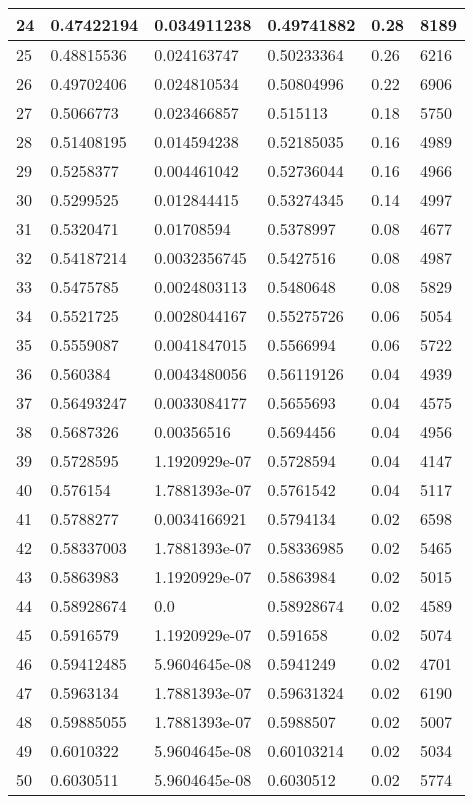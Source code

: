 \begin{longtable}{|l|l|l|l|l|l|}
24 & 0.47422194 & 0.034911238 & 0.49741882 & 0.28 & 8189 \\ \hline 
25 & 0.48815536 & 0.024163747 & 0.50233364 & 0.26 & 6216 \\ \hline 
26 & 0.49702406 & 0.024810534 & 0.50804996 & 0.22 & 6906 \\ \hline 
27 & 0.5066773 & 0.023466857 & 0.515113 & 0.18 & 5750 \\ \hline 
28 & 0.51408195 & 0.014594238 & 0.52185035 & 0.16 & 4989 \\ \hline 
29 & 0.5258377 & 0.004461042 & 0.52736044 & 0.16 & 4966 \\ \hline 
30 & 0.5299525 & 0.012844415 & 0.53274345 & 0.14 & 4997 \\ \hline 
31 & 0.5320471 & 0.01708594 & 0.5378997 & 0.08 & 4677 \\ \hline 
32 & 0.54187214 & 0.0032356745 & 0.5427516 & 0.08 & 4987 \\ \hline 
33 & 0.5475785 & 0.0024803113 & 0.5480648 & 0.08 & 5829 \\ \hline 
34 & 0.5521725 & 0.0028044167 & 0.55275726 & 0.06 & 5054 \\ \hline 
35 & 0.5559087 & 0.0041847015 & 0.5566994 & 0.06 & 5722 \\ \hline 
36 & 0.560384 & 0.0043480056 & 0.56119126 & 0.04 & 4939 \\ \hline 
37 & 0.56493247 & 0.0033084177 & 0.5655693 & 0.04 & 4575 \\ \hline 
38 & 0.5687326 & 0.00356516 & 0.5694456 & 0.04 & 4956 \\ \hline 
39 & 0.5728595 & 1.1920929e-07 & 0.5728594 & 0.04 & 4147 \\ \hline 
40 & 0.576154 & 1.7881393e-07 & 0.5761542 & 0.04 & 5117 \\ \hline 
41 & 0.5788277 & 0.0034166921 & 0.5794134 & 0.02 & 6598 \\ \hline 
42 & 0.58337003 & 1.7881393e-07 & 0.58336985 & 0.02 & 5465 \\ \hline 
43 & 0.5863983 & 1.1920929e-07 & 0.5863984 & 0.02 & 5015 \\ \hline 
44 & 0.58928674 & 0.0 & 0.58928674 & 0.02 & 4589 \\ \hline 
45 & 0.5916579 & 1.1920929e-07 & 0.591658 & 0.02 & 5074 \\ \hline 
46 & 0.59412485 & 5.9604645e-08 & 0.5941249 & 0.02 & 4701 \\ \hline 
47 & 0.5963134 & 1.7881393e-07 & 0.59631324 & 0.02 & 6190 \\ \hline 
48 & 0.59885055 & 1.7881393e-07 & 0.5988507 & 0.02 & 5007 \\ \hline 
49 & 0.6010322 & 5.9604645e-08 & 0.60103214 & 0.02 & 5034 \\ \hline 
50 & 0.6030511 & 5.9604645e-08 & 0.6030512 & 0.02 & 5774 \\ \hline 
\end{longtable}